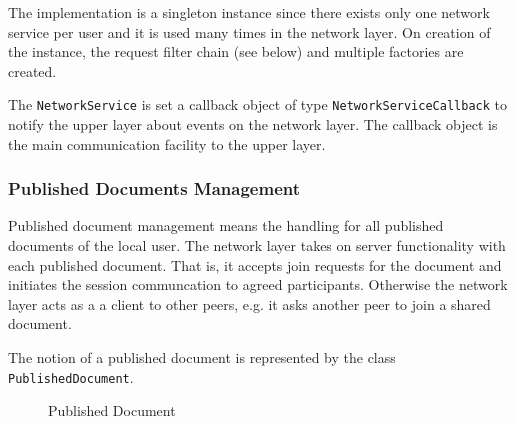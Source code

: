 The implementation is a singleton instance since there exists only one network service per user and it is used many times in the network layer. On creation of the instance, the request filter chain (see below) and multiple factories are created.

The \texttt{NetworkService} is set a callback object of type \texttt{NetworkServiceCallback} to notify the upper layer about events on the network layer. The callback object is the main communication facility to the upper layer.


\subsubsection{Published Documents Management}
Published document management means the handling for all published documents of the local user. The network layer takes on server functionality with each published document. That is, it accepts join requests for the document and initiates the session communcation to agreed participants. Otherwise the network layer acts as a a client to other peers, e.g. it asks another peer to join a shared document. 

The notion of a published document is represented by the class \texttt{PublishedDocument}.

\begin{figure}[H]
 \centering
 \caption{Published Document}
 \label{fig:network.discovery.publisheddocument.uml}
\end{figure}

